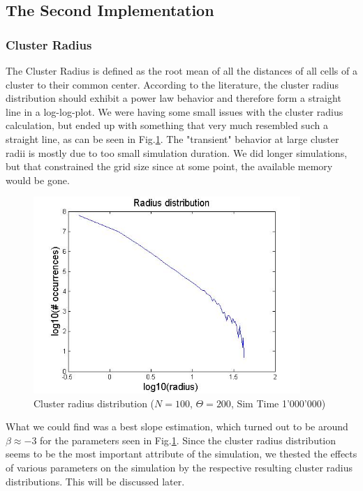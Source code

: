 \documentclass[11pt]{article}
\begin{document}
\subsection{The Second Implementation}
\subsubsection{Cluster Radius}
The Cluster Radius is defined as the root mean of all the distances of all cells of a cluster to their common center. According to the literature, the cluster radius distribution should exhibit a power law behavior and therefore form a straight line in a log-log-plot. We were having some small issues with the cluster radius calculation, but ended up with something that very much resembled such a straight line, as can be seen in Fig.\ref{raddist1}. The "transient" behavior at large cluster radii is mostly due to too small simulation duration. We did longer simulations, but that constrained the grid size since at some point, the available memory would be gone. 
\begin{figure}[H]
\includegraphics[width=0.9\textwidth,keepaspectratio=true]{Pictures/RadiusDist_100_200_1M.jpg}
\caption{Cluster radius distribution ($N=100$, $\Theta=200$, Sim Time 1'000'000)}
\label{raddist1}
\end{figure}
What we could find was a best slope estimation, which turned out to be around $\beta \approx -3$ for the parameters seen in Fig.\ref{raddist1}. Since the cluster radius distribution seems to be the most important attribute of the simulation, we thested the effects of various parameters on the simulation by the respective resulting cluster radius distributions. This will be discussed later.
\end{document}
